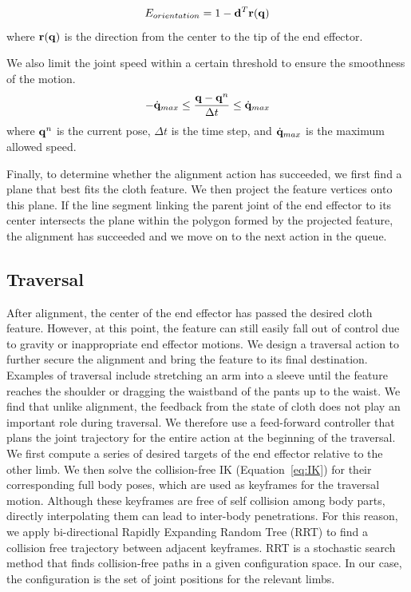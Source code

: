 \begin{equation}
  E_{orientation} = 1-\mathbf{d}^T\mathbf{r(q})
  \label{eq:orientation}
\end{equation}
where $\mathbf{r(q)}$ is the direction from the center to the tip of the end effector.

We also limit the joint speed within a certain threshold to ensure the smoothness of the motion.
\begin{equation}
  -\dot{\mathbf{q}}_{max} \leq \frac{\mathbf{q} - \mathbf{q}^n}{\Delta t} \leq \dot{\mathbf{q}}_{max}
  \label{eq:speed}
\end{equation}
where $\mathbf{q}^n$ is the current pose, $\Delta t$ is the time step, and $\dot{\mathbf{q}}_{max}$ is the maximum allowed speed.

Finally, to determine whether the alignment action has succeeded, we first find a plane that best fits the cloth feature. We then project the feature vertices onto this plane. If the line segment linking the parent joint of the end effector to its center intersects the plane within the polygon formed by the projected feature, the alignment has succeeded and we move on to the next action in the queue.


\subsection{Traversal}
After alignment, the center of the end effector has passed the desired cloth feature. However, at this point, the feature can still easily fall out of control due to gravity or inappropriate end effector motions. We design a traversal action to further secure the alignment and bring the feature to its final destination. Examples of traversal include stretching an arm into a sleeve until the feature reaches the shoulder or dragging the waistband of the pants up to the waist. We find that unlike alignment, the feedback from the state of cloth does not play an important role during traversal. We therefore use a feed-forward controller that plans the joint trajectory for the entire action at the beginning of the traversal. We first compute a series of desired targets of the end effector relative to the other limb. We then solve the collision-free IK (Equation~\ref{eq:IK}) for their corresponding full body poses, which are used as keyframes for the traversal motion. Although these keyframes are free of self collision among body parts, directly interpolating them can lead to inter-body penetrations. For this reason, we apply bi-directional Rapidly Expanding Random Tree (RRT) \cite{LaValleK:2001} to find a collision free trajectory between adjacent keyframes. RRT is a stochastic search method that finds collision-free paths in a given configuration space. In our case, the configuration is the set of joint positions for the relevant limbs.

